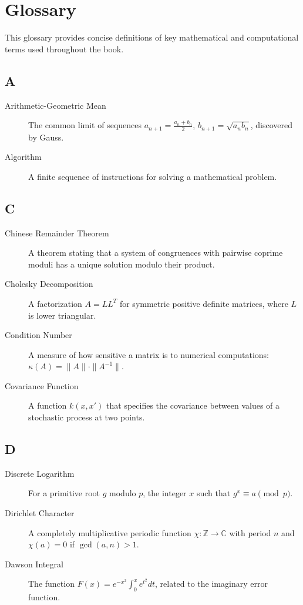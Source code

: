 \chapter{Glossary}
\label{app:glossary}

This glossary provides concise definitions of key mathematical and computational terms used throughout the book.

\section*{A}
\begin{description}
\item[Arithmetic-Geometric Mean] The common limit of sequences $a_{n+1} = \frac{a_n+b_n}{2}$, $b_{n+1} = \sqrt{a_n b_n}$, discovered by Gauss.
\item[Algorithm] A finite sequence of instructions for solving a mathematical problem.
\end{description}

\section*{C}
\begin{description}
\item[Chinese Remainder Theorem] A theorem stating that a system of congruences with pairwise coprime moduli has a unique solution modulo their product.
\item[Cholesky Decomposition] A factorization $A = LL^T$ for symmetric positive definite matrices, where $L$ is lower triangular.
\item[Condition Number] A measure of how sensitive a matrix is to numerical computations: $\kappa(A) = \|A\| \cdot \|A^{-1}\|$.
\item[Covariance Function] A function $k(x,x')$ that specifies the covariance between values of a stochastic process at two points.
\end{description}

\section*{D}
\begin{description}
\item[Discrete Logarithm] For a primitive root $g$ modulo $p$, the integer $x$ such that $g^x \equiv a \pmod{p}$.
\item[Dirichlet Character] A completely multiplicative periodic function $\chi: \mathbb{Z} \to \mathbb{C}$ with period $n$ and $\chi(a) = 0$ if $\gcd(a,n) > 1$.
\item[Dawson Integral] The function $F(x) = e^{-x^2} \int_0^x e^{t^2} dt$, related to the imaginary error function.
\end{description}

